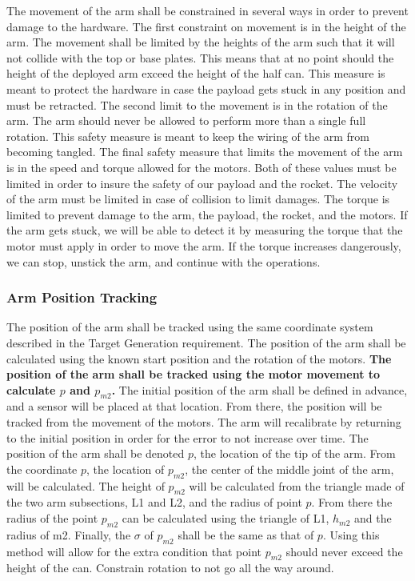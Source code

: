 The movement of the arm shall be constrained in several ways in order to prevent damage to the hardware. 
The first constraint on movement is in the height of the arm. The movement shall be limited by the 
heights of the arm such that it will not collide with the top or base plates. This means that at no 
point should the height of the deployed arm exceed the height of the half can. This measure is meant to 
protect the hardware in case the payload gets stuck in any position and must be retracted. The second 
limit to the movement is in the rotation of the arm. The arm should never be allowed to perform more 
than a single full rotation. This safety measure is meant to keep the wiring of the arm from becoming 
tangled. The final safety measure that limits the movement of the arm is in the speed and torque allowed 
for the motors. Both of these values must be limited in order to insure the safety of our payload and 
the rocket. The velocity of the arm must be limited in case of collision to limit damages. The torque is 
limited to prevent damage to the arm, the payload, the rocket, and the motors. If the arm gets stuck, we 
will be able to detect it by measuring the torque that the motor must apply in order to move the arm. If 
the torque increases dangerously, we can stop, unstick the arm, and continue with the operations.

\subsubsection{Arm Position Tracking}
The position of the arm shall be tracked using the same coordinate system described in the Target Generation requirement.
The position of the arm shall be calculated using the known start position and the rotation of the motors.
\textbf{The position of the arm shall be tracked using the motor movement to calculate \(p\) and 
\(p_{m2}\).}
The initial position of the arm shall be defined in advance, and a sensor will be placed at that location. 
From there, the position will be tracked from the movement of the motors.
The arm will recalibrate by returning to the initial position in order for the error to not increase over
 time.
The position of the arm shall be denoted \(p\), the location of the tip of the arm.
From the coordinate \(p\), the location of \(p_{m2}\), the center of the middle joint of the arm, will be
 calculated. The height of \(p_{m2}\) will be calculated from the triangle made of the two arm subsections, 
L1 and L2, and the radius of point \(p\). From there the radius of the point \(p_{m2}\) can be calculated
 using the triangle of L1, \(h_{m2}\) and the radius of m2. Finally, the \(\sigma\) of \(p_{m2}\) shall 
be the same as that of \(p\).
Using this method will allow for the extra condition that point \(p_{m2}\) should never exceed the height
 of the can.
Constrain rotation to not go all the way around.

